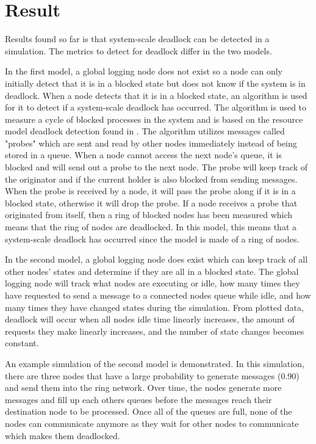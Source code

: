 \documentclass{article}
\begin{document}
\section{Result} %

Results found so far is that system-scale deadlock can be detected in a simulation. The metrics to detect for deadlock differ in the two models.

In the first model, a global logging node does not exist so a node can only initially detect that it is in a blocked state but does not know if the system is in deadlock. When a node detects that it is in a blocked state, an algorithm is used for it to detect if a system-scale deadlock has occurred. The algorithm is used to measure a cycle of blocked processes in the system and is based on the resource model deadlock detection found in \cite[p. 149]{1983_Chandy}. The algorithm utilizes messages called "probes" which are sent and read by other nodes immediately instead of being stored in a queue. When a node cannot access the next node's queue, it is blocked and will send out a probe to the next node. The probe will keep track of the originator and if the current holder is also blocked from sending messages. When the probe is received by a node, it will pass the probe along if it is in a blocked state, otherwise it will drop the probe. If a node receives a probe that originated from itself, then a ring of blocked nodes has been measured which means that the ring of nodes are deadlocked. In this model, this means that a system-scale deadlock has occurred since the model is made of a ring of nodes.

In the second model, a global logging node does exist which can keep track of all other nodes' states and determine if they are all in a blocked state. The global logging node will track what nodes are executing or idle, how many times they have requested to send a message to a connected nodes queue while idle, and how many times they have changed states during the simulation. From plotted data, deadlock will occur when all nodes idle time linearly increases, the amount of requests they make linearly increases, and the number of state changes becomes constant. 

An example simulation of the second model is demonstrated. In this simulation, there are three nodes that have a large probability to generate messages (0.90) and send them into the ring network. Over time, the nodes generate more messages and fill up each others queues before the messages reach their destination node to be processed. Once all of the queues are full, none of the nodes can communicate anymore as they wait for other nodes to communicate which makes them deadlocked.
\end{document}
